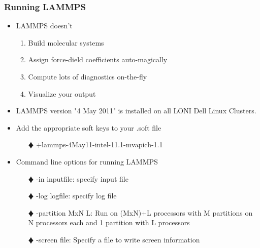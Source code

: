 \documentclass[slidestop,mathserif,compress,xcolor=svgnames]{beamer}
\begin{document}
\begin{frame}
  \frametitle{\small Running LAMMPS}
  \begin{itemize}
    \item LAMMPS doesn't
    \begin{enumerate}
      \item Build molecular systems
      \item Assign force-dield coefficients auto-magically
      \item Compute lots of diagnostics on-the-fly
      \item Visualize your output
    \end{enumerate}
    \item LAMMPS version "4 May 2011" is installed on all LONI Dell Linux Clusters.%
    \item Add the appropriate soft keys to your .soft file
    \begin{enumerate}
      \item[$\vardiamond$]  +lammps-4May11-intel-11.1-mvapich-1.1
    \end{enumerate}
    \item Command line options for running LAMMPS
    \begin{itemize}
      \item[$\vardiamond$] -in inputfile: specify input file
      \item[$\vardiamond$] -log logfile: specify log file
      \item[$\vardiamond$] -partition MxN L: Run on (MxN)+L processors with M partitions on N processors each and 1 partition with L processors
      \item[$\vardiamond$] -screen file: Specify a file to write screen information
    \end{itemize}
  \end{itemize}
\end{frame}
\end{document}

